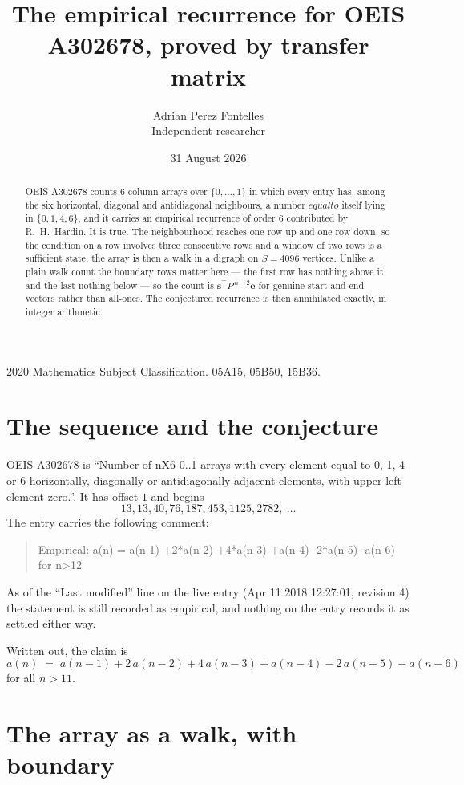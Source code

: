 \documentclass[11pt,a4paper]{article}
\title{The empirical recurrence for OEIS A302678, proved by transfer matrix}
\author{Adrian Perez Fontelles\\ \small Independent researcher}
\date{31 August 2026}
\theoremstyle{plain}
\theoremstyle{definition}
\begin{document}
\maketitle

\begin{abstract}
OEIS A302678 counts $6$-column arrays over $\{0,\dots,1\}$ in which every entry has,
among the six horizontal, diagonal and antidiagonal neighbours, a number $equal to$ itself lying in $\{0,1,4,6\}$, and it carries an empirical
recurrence of order $6$ contributed by R.~H.~Hardin. It is true. The neighbourhood
reaches one row up and one row down, so the condition on a row involves three consecutive
rows and a window of two rows is a sufficient state; the array is then a walk in a digraph
on $S=4096$ vertices. Unlike a plain walk count the boundary rows matter here --- the first
row has nothing above it and the last nothing below --- so the count is
$\mathbf{s}^{\!\top}P^{\,n-2}\mathbf{e}$ for genuine start and end vectors rather than
all-ones. The conjectured recurrence is then annihilated exactly, in integer arithmetic.
\end{abstract}

\noindent\small 2020 Mathematics Subject Classification. 05A15, 05B50, 15B36.\normalsize

\section{The sequence and the conjecture}

OEIS A302678 is ``Number of nX6 0..1 arrays with every element equal to 0, 1, 4 or 6 horizontally, diagonally or antidiagonally adjacent elements, with upper left element zero.''. It has offset
$1$ and begins
\[
13, 13, 40, 76, 187, 453, 1125, 2782,\ \dots
\]
The entry carries the following comment:
\begin{quote}\small
Empirical: a(n) = a(n-1) +2*a(n-2) +4*a(n-3) +a(n-4) -2*a(n-5) -a(n-6) for n>12
\end{quote}
As of the ``Last modified'' line on the live entry (Apr 11 2018 12:27:01, revision
4) the statement is still recorded as empirical, and nothing on the entry
records it as settled either way.

Written out, the claim is
\begin{equation}\label{eq:conj}
a(n)\;=\;a(n-1) + 2\,a(n-2) + 4\,a(n-3) + a(n-4) - 2\,a(n-5) - a(n-6)
\end{equation}
for all $n>11$.

\section{The array as a walk, with boundary}
\end{document}

